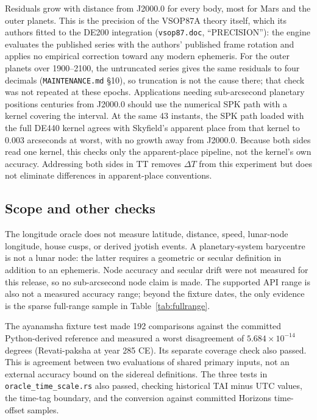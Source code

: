 \documentclass[11pt]{article}
\begin{document}
Residuals grow with distance from J2000.0 for every body, most for Mars and the
outer planets. This is the precision of the VSOP87A theory itself, which its authors
fitted to the DE200 integration (\texttt{vsop87.doc}, ``PRECISION''): the engine evaluates
the published series with the authors' published frame rotation and applies no empirical
correction toward any modern ephemeris. For the outer planets over 1900--2100, the
untruncated series gives the same residuals to four decimals (\texttt{MAINTENANCE.md}
\S10), so truncation is not the cause there; that check was not repeated at these
epochs. Applications needing sub-arcsecond planetary positions centuries from J2000.0
should use the numerical SPK path with a kernel covering the interval. At the same 43
instants, the SPK path loaded with the full DE440 kernel agrees with Skyfield's apparent
place from that kernel to 0.003 arcseconds at worst, with no growth away from J2000.0.
Because both sides read one kernel, this checks only the apparent-place pipeline, not
the kernel's own accuracy. Addressing both sides in TT removes $\Delta T$ from this
experiment but does not eliminate differences in apparent-place conventions.

\subsection{Scope and other checks}

The longitude oracle does not measure latitude, distance, speed, lunar-node longitude,
house cusps, or derived jyotish events. A planetary-system barycentre is not a lunar
node: the latter requires a geometric or secular definition in addition to an ephemeris.
Node accuracy and secular drift were not measured for this release, so no
sub-arcsecond node claim is made. The supported API range is also not a measured
accuracy range; beyond the fixture dates, the only evidence is the sparse
full-range sample in Table~\ref{tab:fullrange}.

The ayanamsha fixture test made 192 comparisons against the committed Python-derived
reference and measured a worst disagreement of $5.684\times10^{-14}$ degrees
(Revati-paksha at year 285 CE). Its separate coverage check also passed. This is
agreement between two evaluations of shared primary inputs, not an external
accuracy bound on the sidereal definitions.
The three tests in \texttt{oracle\_time\_scale.rs} also passed, checking historical
TAI minus UTC values, the time-tag boundary, and the conversion against committed
Horizons time-offset samples.
\end{document}
